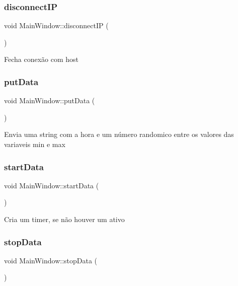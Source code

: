 \subsubsection{\texorpdfstring{disconnect\+IP}{disconnectIP}}
{\footnotesize\ttfamily void Main\+Window\+::disconnect\+IP (\begin{DoxyParamCaption}{ }\end{DoxyParamCaption})\hspace{0.3cm}{\ttfamily [slot]}}

Fecha conexão com host \mbox{\label{class_main_window_afdfeb13ec363b0eb8ecacaf0aa13b605}} 
\subsubsection{\texorpdfstring{put\+Data}{putData}}
{\footnotesize\ttfamily void Main\+Window\+::put\+Data (\begin{DoxyParamCaption}{ }\end{DoxyParamCaption})\hspace{0.3cm}{\ttfamily [slot]}}

Envia uma string com a hora e um número randomico entre os valores das variaveis \textquotesingle{}min\textquotesingle{} e \textquotesingle{}max\textquotesingle{} \mbox{\label{class_main_window_a4c2e9be0c7a1c2010da3424d48b312fa}} 
\subsubsection{\texorpdfstring{start\+Data}{startData}}
{\footnotesize\ttfamily void Main\+Window\+::start\+Data (\begin{DoxyParamCaption}{ }\end{DoxyParamCaption})\hspace{0.3cm}{\ttfamily [slot]}}

Cria um timer, se não houver um ativo \mbox{\label{class_main_window_a79fdaf1fd769f0584f50da34e415b3de}} 
\subsubsection{\texorpdfstring{stop\+Data}{stopData}}
{\footnotesize\ttfamily void Main\+Window\+::stop\+Data (\begin{DoxyParamCaption}{ }\end{DoxyParamCaption})\hspace{0.3cm}{\ttfamily [slot]}}

